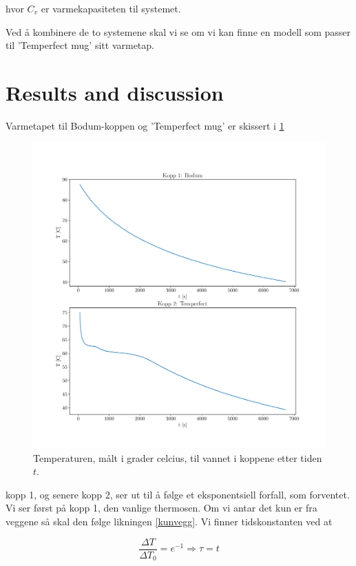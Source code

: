 \documentclass[ reprint, amsmath,amssymb, aps]{revtex4-2}
\begin{document}
hvor $C_v$ er varmekapasiteten til systemet.

Ved å kombinere de to systemene skal vi se om vi kan finne en modell som passer til 'Temperfect mug' sitt varmetap.
\clearpage
\onecolumngrid

\section{Results and discussion}


Varmetapet til Bodum-koppen og 'Temperfect mug' er skissert i \ref{varmetapRep}


\begin{figure}[ht]
\centering
\includegraphics[scale=0.5]{tempkopp.pdf}
\caption{Temperaturen, målt i grader celcius, til vannet i koppene etter tiden $t$.}
\label{varmetapRep}
\end{figure}

\twocolumngrid
\clearpage
kopp 1, og senere kopp 2, ser ut til å følge et eksponentsiell forfall, som forventet. Vi ser først på kopp 1, den vanlige thermosen. Om vi antar det kun er fra veggene så skal den følge likningen \ref{kunvegg}. Vi finner tidskonstanten ved at 

$$\frac{\Delta T}{\Delta T_0} = e^{-1} \Rightarrow \tau = t$$
\end{document}
